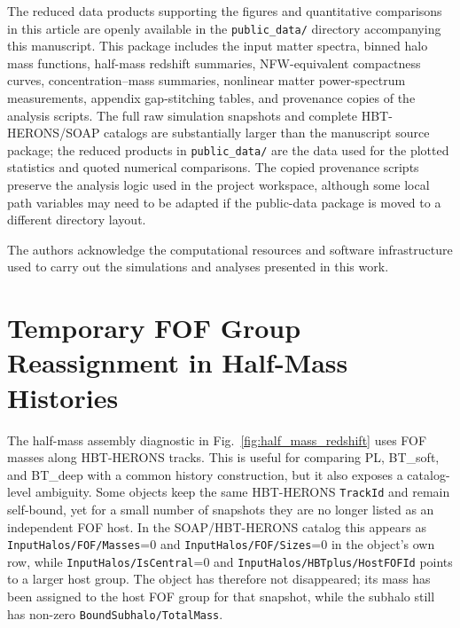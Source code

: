 \documentclass[
 reprint,
 superscriptaddress,
 nofootinbib,
 nobibnotes,
 amsmath,
 amssymb,
 aps,
 prd,
 floatfix,
 longbibliography
]{revtex4-2}
\begin{document}
The reduced data products supporting the figures and quantitative comparisons in this article are openly available in the \texttt{public\_data/} directory accompanying this manuscript. This package includes the input matter spectra, binned halo mass functions, half-mass redshift summaries, NFW-equivalent compactness curves, concentration--mass summaries, nonlinear matter power-spectrum measurements, appendix gap-stitching tables, and provenance copies of the analysis scripts. The full raw simulation snapshots and complete \textsc{HBT-HERONS}/\textsc{SOAP} catalogs are substantially larger than the manuscript source package; the reduced products in \texttt{public\_data/} are the data used for the plotted statistics and quoted numerical comparisons. The copied provenance scripts preserve the analysis logic used in the project workspace, although some local path variables may need to be adapted if the public-data package is moved to a different directory layout.

\begin{acknowledgments}
The authors acknowledge the computational resources and software infrastructure used to carry out the simulations and analyses presented in this work.
\end{acknowledgments}

\clearpage

\appendix

\section{Temporary FOF Group Reassignment in Half-Mass Histories}
\label{app:fof_gap_stitching}

The half-mass assembly diagnostic in Fig.~\ref{fig:half_mass_redshift} uses FOF masses along \textsc{HBT-HERONS} tracks. This is useful for comparing PL, BT\_soft, and BT\_deep with a common history construction, but it also exposes a catalog-level ambiguity. Some objects keep the same \textsc{HBT-HERONS} \texttt{TrackId} and remain self-bound, yet for a small number of snapshots they are no longer listed as an independent FOF host. In the \textsc{SOAP}/\textsc{HBT-HERONS} catalog this appears as \texttt{InputHalos/FOF/Masses}=0 and \texttt{InputHalos/FOF/Sizes}=0 in the object's own row, while \texttt{InputHalos/IsCentral}=0 and \texttt{InputHalos/HBTplus/HostFOFId} points to a larger host group. The object has therefore not disappeared; its mass has been assigned to the host FOF group for that snapshot, while the subhalo still has non-zero \texttt{BoundSubhalo/TotalMass}.
\end{document}
